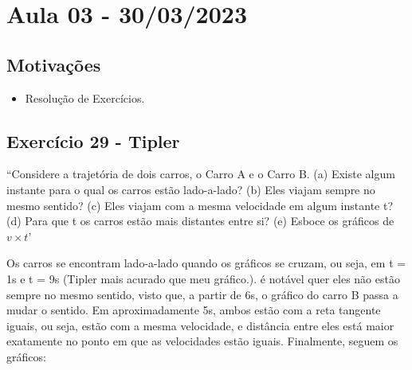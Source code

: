 \documentclass[PhysicsI/physics_notes.tex]{subfiles}
\begin{document}
\section{ Aula 03 - 30/03/2023}
\subsection{Motivações}
\begin{itemize}
	\item Resolução de Exercícios.
\end{itemize}
\subsection{Exercício 29 - Tipler}
``Considere a trajetória de dois carros, o Carro A e o Carro B. (a) Existe algum instante para o qual os carros estão lado-a-lado? (b) Eles viajam sempre no mesmo sentido? (c) Eles viajam com a mesma velocidade em algum instante t? (d) Para que t os carros estão mais distantes entre si? (e) Esboce os gráficos de $v\times t$'
\begin{center}
\end{center}
Os carros se encontram lado-a-lado quando os gráficos se cruzam, ou seja, em t = 1s e t = 9s (Tipler mais acurado que meu gráfico.). é notável
quer eles não estão sempre no mesmo sentido, visto que, a partir de 6s, o gráfico do carro B passa a mudar o sentido. Em aproximadamente 5s,
ambos estão com a reta tangente iguais, ou seja, estão com a mesma velocidade, e distância entre eles está maior exatamente no ponto em que as
velocidades estão iguais. Finalmente, seguem os gráficos:
\begin{center}
\end{center}
\end{document}
